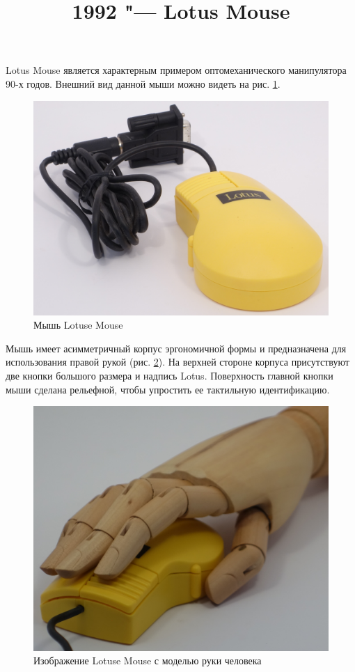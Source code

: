 \documentclass[11pt, a4paper]{article}
\begin{document}
\title{1992 "--- Lotus Mouse}
\date{}
\maketitle

Lotus Mouse является характерным примером оптомеханического манипулятора 90-х годов. Внешний вид данной мыши можно видеть на рис. \ref{fig:LotusPic}.

\begin{figure}[h]
    \centering
    \includegraphics[scale=0.6]{1992_lotus_mouse/pic.jpg}
    \caption{Мышь Lotuse Mouse}
    \label{fig:LotusPic}
\end{figure}

Мышь имеет асимметричный корпус эргономичной формы и предназначена для использования правой рукой (рис. \ref{fig:LotusHand}). На верхней стороне корпуса присутствуют две кнопки большого размера и надпись Lotus. Поверхность главной кнопки мыши сделана рельефной, чтобы упростить ее тактильную идентификацию.

\begin{figure}[h]
    \centering
    \includegraphics[scale=0.3]{1992_lotus_mouse/mis3.JPG}
    \caption{Изображение Lotuse Mouse с моделью руки человека}
    \label{fig:LotusHand}
\end{figure}
\end{document}
